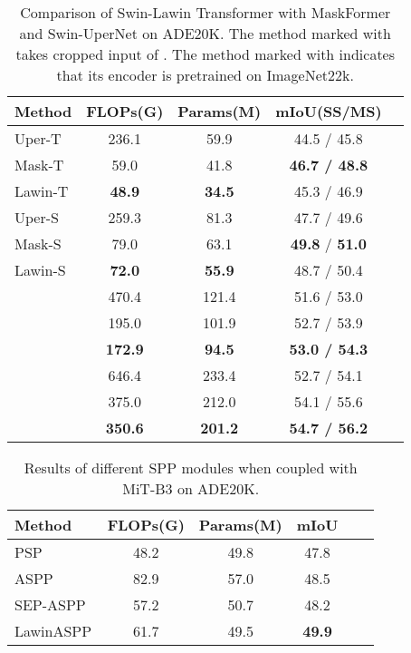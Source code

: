 \documentclass[10pt,twocolumn,letterpaper]{article}
\begin{document}
\begin{table}
\small
  \centering
  \renewcommand\arraystretch{1.1}
  
  \begin{tabular}{lcccc} \hline
  
  \hline
  Method & FLOPs(G) & Params(M) & mIoU(SS/MS)\\
\hline

 
   Uper-T & 236.1 &  59.9 & 44.5 / 45.8 \\
   Mask-T & 59.0 & 41.8 & \textbf{46.7 / 48.8} \\ 
   Lawin-T &  \textbf{48.9} &  \textbf{34.5} & 45.3 / 46.9 \\
   \hline
   Uper-S & 259.3 &  81.3  & 47.7 / 49.6 \\
   Mask-S & 79.0 &  63.1  & \textbf{49.8} / \textbf{51.0} \\
   Lawin-S &  \textbf{72.0} &  \textbf{55.9}  & 48.7 / 50.4 \\
   \hline
    &  470.4 & 121.4  & 51.6 / 53.0 \\
    &  195.0 & 101.9  & 52.7 / 53.9 \\
    &  \textbf{172.9} & \textbf{94.5}  & \textbf{53.0 / 54.3} \\
   \hline
    &  646.4 & 233.4  & 52.7 / 54.1\\
    &  375.0 & 212.0  & 54.1 / 55.6 \\
    &  \textbf{350.6} & \textbf{201.2}  & \textbf{54.7 / 56.2} \\
  \hline
  
  
  \hline
  
  \end{tabular}\vspace{-0.1cm}
  \caption{Comparison of Swin-Lawin Transformer with MaskFormer and Swin-UperNet on ADE20K. The method marked with  takes cropped input of . The method marked with  indicates that its encoder is pretrained on ImageNet22k.}
  \label{tab:swin}
\end{table}

\begin{table}
\small
  \centering
  \renewcommand\arraystretch{1.15}
  
  \begin{tabular}{lcc|ccc} \hline
  
  \hline
  \small{Method}  & FLOPs(G) & Params(M) & mIoU \\
\hline
  PSP~\cite{zhao2017pyramid}  & 48.2 & 49.8 & 47.8 \\
  ASPP~\cite{chen2017rethinking} & 82.9 & 57.0 & 48.5 \\
  SEP-ASPP~\cite{chen2018encoder} & 57.2 & 50.7 & 48.2 \\
  LawinASPP & 61.7 & 49.5 & \textbf{49.9} \\
  \hline
  
  
  \hline
  
  \end{tabular}
  \caption{Results of different SPP modules when coupled with MiT-B3 on ADE20K.}
  \label{tb:spp}
\end{table}
\end{document}
